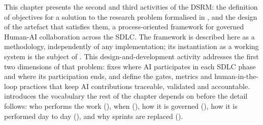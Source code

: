 \label{chap:proposal}

This chapter presents the second and third activities of the \ac{DSRM}: the definition of objectives for a solution to the research problem formalised in , and the design of the artefact that satisfies them, a process-oriented framework for governed Human-AI collaboration across the \ac{SDLC}. The framework is described here as a methodology, independently of any implementation; its instantiation as a working system is the subject of . This design-and-development activity addresses the first two dimensions of that problem:  fixes where AI participates in each \ac{SDLC} phase and where its participation ends, and  define the gates, metrics and human-in-the-loop practices that keep AI contributions traceable, validated and accountable.  introduces the vocabulary the rest of the chapter depends on before the detail follows: who performs the work (), when (), how it is governed (), how it is performed day to day (), and why sprints are replaced ().

